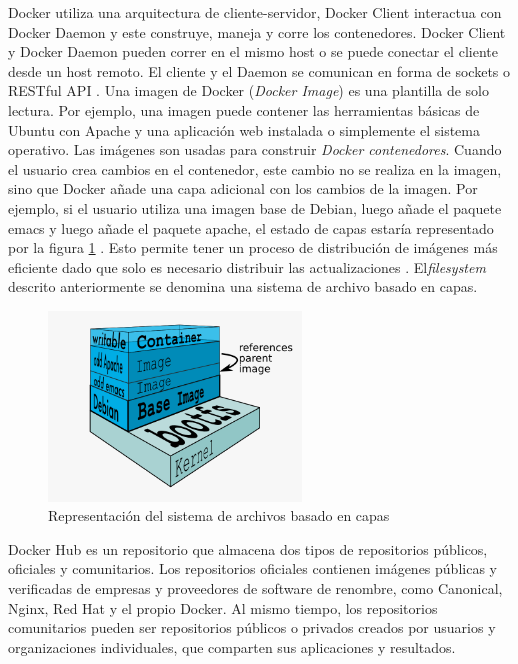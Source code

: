 Docker utiliza una arquitectura de cliente-servidor, Docker Client interactua con Docker Daemon y este construye, maneja y corre los contenedores. Docker Client y Docker Daemon pueden correr en el mismo host o se puede conectar el cliente desde un host remoto. El cliente y el Daemon se comunican en forma de sockets o RESTful API \cite{Docker:2015:understanding}.
Una imagen de Docker (\textit{Docker Image}) es una plantilla de solo lectura. Por ejemplo, una imagen puede contener las herramientas básicas de Ubuntu con Apache y una aplicación web instalada o simplemente el sistema operativo. Las imágenes son usadas para construir \emph{Docker contenedores}. Cuando el usuario crea cambios en el contenedor, este cambio no se realiza en la imagen, sino  que Docker añade una capa adicional con los cambios de la imagen\cite{bui2015analysis}. Por ejemplo, si el usuario utiliza una imagen base de Debian, luego añade el paquete emacs y luego añade el paquete apache, el estado de capas estaría representado por la figura \ref{fig:arquitectura} \cite{Docker:2015:Online}. Esto permite tener un proceso de distribución de imágenes más eficiente dado que solo es necesario distribuir las actualizaciones \cite{bui2015analysis}. El\textit{filesystem} descrito anteriormente se denomina una sistema de archivo basado en capas.
\begin{figure}[]
  \centering
  \includegraphics[width=0.6\textwidth]{Figures/docker-filesystems-multilayer}
    \caption{Representación del sistema de archivos basado en capas}
    \label{fig:arquitectura}
\end{figure}	

Docker Hub es un repositorio que almacena dos tipos de repositorios públicos, oficiales y comunitarios. Los repositorios oficiales contienen imágenes públicas y verificadas de empresas y proveedores de software de renombre, como Canonical, Nginx, Red Hat y el propio Docker. Al mismo tiempo, los repositorios comunitarios pueden ser repositorios públicos o privados creados por usuarios y organizaciones individuales, que comparten sus aplicaciones y resultados. 

